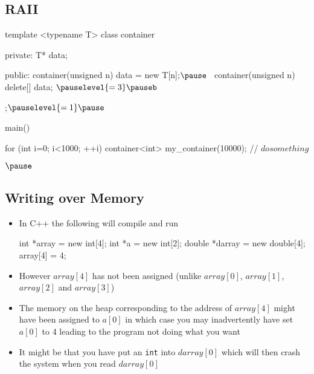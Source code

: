 
\begin{slide}
\section{RAII}

\begin{PauseHighLight}
\begin{cpp}
  template <typename T>
  class container {
    private:
      T* data;
    
    public:
      container(unsigned n) {data = new T[n];}$\pause$
      ~container(unsigned n) {delete[] data;} $\pauselevel{=3}\pauseb$
  };$\pauselevel{=1}\pause$

    
    main() {

      for (int i=0; i<1000; ++i) {
        container<int> my_container(10000);
        // $do something$
      }

    }$\pause$
\end{cpp}

\end{PauseHighLight}

\end{slide}



\begin{slide}
\section[-2]{Writing over Memory}

\begin{PauseHighLight}
  \begin{itemize}
  \item In C++ the following will compile and run
    \begin{cpp}
      int *array = new int[4];
      int *a = new int[2];
      double *darray = new double[4];
      array[4] = 4;
    \end{cpp}\pause
    \vspace*{-1cm}
  \item However \jl$array[4]$ has not been assigned (unlike
    \jl$array[0]$, \jl$array[1]$, \jl$array[2]$ and \jl$array[3]$)\pause
  \item The memory on the heap corresponding to the address of
    \jl$array[4]$ might have been assigned to \jl$a[0]$ in which case
    you may inadvertently have set \jl$a[0]$ to 4 leading to the
    program not doing what you want\pause
  \item It might be that you have put an \texttt{int} into
    \jl$darray[0]$ which will then crash the system when you read
    \jl$darray[0]$\pause
  \end{itemize}
\end{PauseHighLight}

\end{slide}

